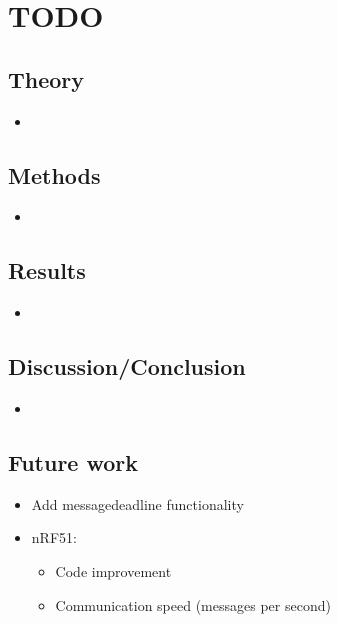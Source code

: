\chapter*{TODO}
\section*{Theory}
\begin{itemize}
    \item 
\end{itemize}

\section*{Methods}
\begin{itemize}
    \item 
\end{itemize}

\section*{Results}
\begin{itemize}
    \item 
\end{itemize}

\section*{Discussion/Conclusion}
\begin{itemize}
    \item
\end{itemize}

\section*{Future work}
\begin{itemize}
    \item Add messagedeadline functionality
    \item nRF51:
    \begin{itemize}
        \item Code improvement
        \item Communication speed (messages per second)
    \end{itemize}
\end{itemize}
